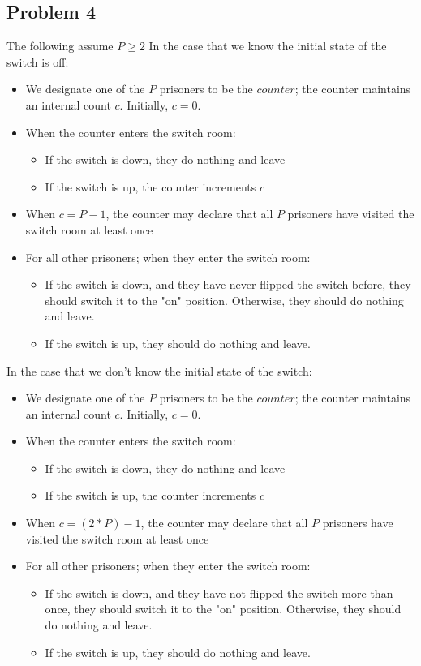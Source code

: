 \documentclass[]{article}
\begin{document}
\subsection{Problem 4}
The following assume $P \geq 2$
In the case that we know the initial state of the switch is off:
\begin{itemize}
	\item We designate one of the $P$ prisoners to be the $counter$; the counter maintains an internal count $c$. Initially, $c = 0$.
	\item When the counter enters the switch room:
	\begin{itemize}
		\item If the switch is down, they do nothing and leave
		\item If the switch is up, the counter increments $c$
	\end{itemize}
	\item When $c = P - 1$, the counter may declare that all $P$ prisoners have visited the switch room at least once
	\item For all other prisoners; when they enter the switch room:
	\begin{itemize}
		\item If the switch is down, and they have never flipped the switch before, they should switch it to the "on" position. Otherwise, they should do nothing and leave.
		\item If the switch is up, they should do nothing and leave.
	\end{itemize}
\end{itemize}
In the case that we don't know the initial state of the switch:
\begin{itemize}
	\item We designate one of the $P$ prisoners to be the $counter$; the counter maintains an internal count $c$. Initially, $c = 0$.
	\item When the counter enters the switch room:
	\begin{itemize}
		\item If the switch is down, they do nothing and leave
		\item If the switch is up, the counter increments $c$
	\end{itemize}
	\item When $c = (2 * P) - 1$, the counter may declare that all $P$ prisoners have visited the switch room at least once
	\item For all other prisoners; when they enter the switch room:
	\begin{itemize}
		\item If the switch is down, and they have not flipped the switch more than once, they should switch it to the "on" position. Otherwise, they should do nothing and leave.
		\item If the switch is up, they should do nothing and leave.
	\end{itemize}
\end{itemize}
\end{document}
